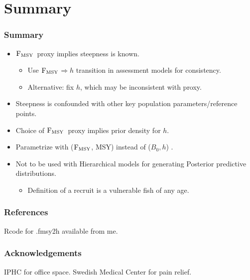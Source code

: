 \documentclass{beamer}
\newcommand{\fmsy}{$\rm{F_{MSY}}$}
\begin{document}
\section{Summary} %
\label{sec:summary}
\begin{frame}[t]\frametitle{Summary}
	\begin{itemize}
		\item<+->  \fmsy\ proxy implies steepness is known.
		\begin{itemize}
			\item Use \fmsy $\Rightarrow h$ transition in assessment models for consistency.
			\item Alternative: fix $h$, which may be inconsistent with proxy.
		\end{itemize}
		\item<+-> Steepness is confounded with other key population parameters/reference points.
		\item<+-> Choice of \fmsy\ proxy implies prior density for $h$.
		\item<+-> Parametrize with (\fmsy, MSY) instead of ($B_0, h$) \cite{Martell2008pam}.
		\item<+-> Not to be used with Hierarchical models for generating Posterior predictive distributions.
		\begin{itemize}
			\item Definition of a recruit is a vulnerable fish of any age.
		\end{itemize}
	\end{itemize}
\end{frame}
%
%

\begin{frame}\frametitle{References}
\scriptsize{


}
Rcode for .fmsy2h available from me.
\end{frame}
 
\begin{frame}
	\frametitle{Acknowledgements}
	IPHC for office space.
	\vfill
	Swedish Medical Center for pain relief.
	

\end{frame}
\end{document}
